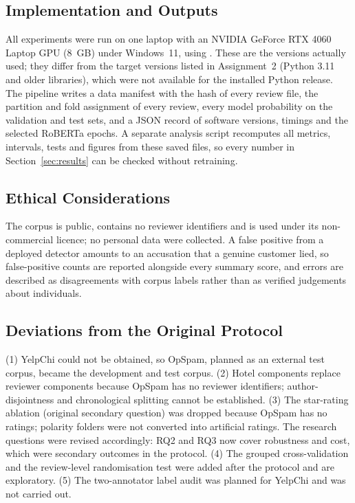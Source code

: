 \subsection{Implementation and Outputs}
All experiments were run on one laptop with an NVIDIA GeForce RTX 4060 Laptop GPU (8~GB) under Windows~11, using \ENVVERSIONS. These are the versions actually used; they differ from the target versions listed in Assignment~2 (Python 3.11 and older libraries), which were not available for the installed Python release. The pipeline writes a data manifest with the hash of every review file, the partition and fold assignment of every review, every model probability on the validation and test sets, and a JSON record of software versions, timings and the selected RoBERTa epochs. A separate analysis script recomputes all metrics, intervals, tests and figures from these saved files, so every number in Section~\ref{sec:results} can be checked without retraining.

\subsection{Ethical Considerations}
The corpus is public, contains no reviewer identifiers and is used under its non-commercial licence; no personal data were collected. A false positive from a deployed detector amounts to an accusation that a genuine customer lied, so false-positive counts are reported alongside every summary score, and errors are described as disagreements with corpus labels rather than as verified judgements about individuals.

\subsection{Deviations from the Original Protocol}
\label{sec:deviations}
(1) YelpChi could not be obtained, so OpSpam, planned as an external test corpus, became the development and test corpus. (2) Hotel components replace reviewer components because OpSpam has no reviewer identifiers; author-disjointness and chronological splitting cannot be established. (3) The star-rating ablation (original secondary question) was dropped because OpSpam has no ratings; polarity folders were not converted into artificial ratings. The research questions were revised accordingly: RQ2 and RQ3 now cover robustness and cost, which were secondary outcomes in the protocol. (4) The grouped cross-validation and the review-level randomisation test were added after the protocol and are exploratory. (5) The two-annotator label audit was planned for YelpChi and was not carried out.
